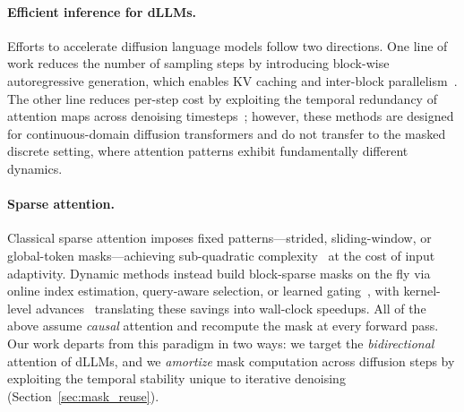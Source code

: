 \paragraph{Efficient inference for dLLMs.}
Efforts to accelerate diffusion language models follow two directions.
One line of work reduces the number of sampling steps by introducing block-wise autoregressive generation, which enables KV caching and inter-block parallelism~\citep{arriola2025block,llada2,wu2025fastdllm,d2f2025}.
The other line reduces per-step cost by exploiting the temporal redundancy of attention maps across denoising timesteps~\citep{yuan2024ditfastattn,zhang2025spargeattn,liteattention2025}; however, these methods are designed for continuous-domain diffusion transformers and do not transfer to the masked discrete setting, where attention patterns exhibit fundamentally different dynamics.

\paragraph{Sparse attention.}
Classical sparse attention imposes fixed patterns---strided, sliding-window, or global-token masks---achieving sub-quadratic complexity~\citep{child2019sparse,beltagy2020longformer,zaheer2020bigbird} at the cost of input adaptivity.
Dynamic methods instead build block-sparse masks on the fly via online index estimation, query-aware selection, or learned gating~\citep{jiang2024minference,tang2024quest,zhu2025tactic,gao2024seerattention,yuan2025nsa}, with kernel-level advances~\citep{dao2022flashattention,dao2023flashattention2,ye2025flashinfer,xu2025xattention} translating these savings into wall-clock speedups.
All of the above assume \emph{causal} attention and recompute the mask at every forward pass.
Our work departs from this paradigm in two ways: we target the \emph{bidirectional} attention of dLLMs, and we \emph{amortize} mask computation across diffusion steps by exploiting the temporal stability unique to iterative denoising (Section~\ref{sec:mask_reuse}).